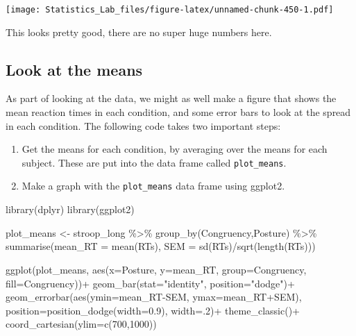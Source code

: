 \documentclass[
]{book}
\newenvironment{Shaded}{\begin{snugshade}}{\end{snugshade}}
\newcommand{\AttributeTok}[1]{\textcolor[rgb]{0.77,0.63,0.00}{#1}}
\newcommand{\DecValTok}[1]{\textcolor[rgb]{0.00,0.00,0.81}{#1}}
\newcommand{\FloatTok}[1]{\textcolor[rgb]{0.00,0.00,0.81}{#1}}
\newcommand{\FunctionTok}[1]{\textcolor[rgb]{0.00,0.00,0.00}{#1}}
\newcommand{\NormalTok}[1]{#1}
\newcommand{\OtherTok}[1]{\textcolor[rgb]{0.56,0.35,0.01}{#1}}
\newcommand{\SpecialCharTok}[1]{\textcolor[rgb]{0.00,0.00,0.00}{#1}}
\newcommand{\StringTok}[1]{\textcolor[rgb]{0.31,0.60,0.02}{#1}}
\begin{document}
\texttt{[image: Statistics\_Lab\_files/figure-latex/unnamed-chunk-450-1.pdf]}

This looks pretty good, there are no super huge numbers here.

\hypertarget{look-at-the-means-1}{%
\subsection{Look at the means}\label{look-at-the-means-1}}

As part of looking at the data, we might as well make a figure that shows the mean reaction times in each condition, and some error bars to look at the spread in each condition. The following code takes two important steps:

\begin{enumerate}
\def\labelenumi{\arabic{enumi}.}
\item
  Get the means for each condition, by averaging over the means for each subject. These are put into the data frame called \texttt{plot\_means}.
\item
  Make a graph with the \texttt{plot\_means} data frame using ggplot2.
\end{enumerate}

\begin{Shaded}
\begin{Highlighting}[]
\FunctionTok{library}\NormalTok{(dplyr)}
\FunctionTok{library}\NormalTok{(ggplot2)}

\NormalTok{plot\_means }\OtherTok{\textless{}{-}}\NormalTok{ stroop\_long }\SpecialCharTok{\%\textgreater{}\%}
            \FunctionTok{group\_by}\NormalTok{(Congruency,Posture) }\SpecialCharTok{\%\textgreater{}\%}
            \FunctionTok{summarise}\NormalTok{(}\AttributeTok{mean\_RT =} \FunctionTok{mean}\NormalTok{(RTs),}
                      \AttributeTok{SEM =} \FunctionTok{sd}\NormalTok{(RTs)}\SpecialCharTok{/}\FunctionTok{sqrt}\NormalTok{(}\FunctionTok{length}\NormalTok{(RTs)))}

\FunctionTok{ggplot}\NormalTok{(plot\_means, }\FunctionTok{aes}\NormalTok{(}\AttributeTok{x=}\NormalTok{Posture, }\AttributeTok{y=}\NormalTok{mean\_RT, }\AttributeTok{group=}\NormalTok{Congruency, }\AttributeTok{fill=}\NormalTok{Congruency))}\SpecialCharTok{+}
  \FunctionTok{geom\_bar}\NormalTok{(}\AttributeTok{stat=}\StringTok{"identity"}\NormalTok{, }\AttributeTok{position=}\StringTok{"dodge"}\NormalTok{)}\SpecialCharTok{+}
  \FunctionTok{geom\_errorbar}\NormalTok{(}\FunctionTok{aes}\NormalTok{(}\AttributeTok{ymin=}\NormalTok{mean\_RT}\SpecialCharTok{{-}}\NormalTok{SEM, }\AttributeTok{ymax=}\NormalTok{mean\_RT}\SpecialCharTok{+}\NormalTok{SEM), }
                \AttributeTok{position=}\FunctionTok{position\_dodge}\NormalTok{(}\AttributeTok{width=}\FloatTok{0.9}\NormalTok{),}
                \AttributeTok{width=}\NormalTok{.}\DecValTok{2}\NormalTok{)}\SpecialCharTok{+}
  \FunctionTok{theme\_classic}\NormalTok{()}\SpecialCharTok{+}
  \FunctionTok{coord\_cartesian}\NormalTok{(}\AttributeTok{ylim=}\FunctionTok{c}\NormalTok{(}\DecValTok{700}\NormalTok{,}\DecValTok{1000}\NormalTok{))}
\end{Highlighting}
\end{Shaded}
\end{document}
